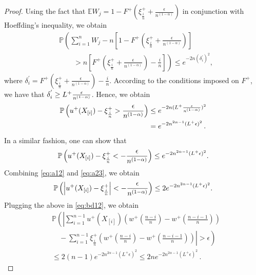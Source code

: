 \begin{proof}
Using the fact that 
$\mathbb{E} W_j = 1-F^{+}\left(\xi^+_{\frac{i}{n}} +\frac{\epsilon}{n^{(1-\alpha)}}\right)$ in conjunction with Hoeffding's inequality, we obtain
\begin{align*}
&\mathbb{P} \left( \sum _{i=1}^{n} W_j - n  \left[1-F^{+}\left(\xi^+_{\frac{i}{n}} +\frac{\epsilon}{n^{(1-\alpha) }  } \right) \right] \right.\\
&\left.\qquad> n
 \left[F^{+}\left(\xi^+_{\frac{i}{n}} +\frac{\epsilon}{n^{(1-\alpha)} } \right) - \frac{i}{n}\right]\right) \le e^{-2n
(\delta^{'}_i)^2},
\end{align*}
where $\delta^{'}_i= F^{+}\left(\xi^+_{\frac{i}{n}} +\frac{\epsilon} {n^{(1-\alpha)} }\right) - \frac{i}{n}$. According to the conditions imposed on $F^+$,  we have that $ \delta^{'}_i \geq L^{+} \frac{\epsilon}{n^{(1-\alpha)}}$.
Hence, we obtain
\begin{align}
\mathbb{P}\left(  u^+(X_{[i]}) - \xi^+_{\frac{i}{n}} > \frac {\epsilon}{n^{(1-\alpha)}} \right) &\le e^{-2n (L^{+}
\frac{\epsilon}{n^{(1-\alpha)}})^2 } \nonumber\\
&= e^{-2n^{2\alpha-1}  (L ^{+} \epsilon)^2}\,.
\label{eq:a12}
\end{align}
In a  similar fashion, one can show that 
\begin{align}
\mathbb{P}\left(  u^+(X_{[i]}) -\xi^+_{\frac{i}{n}} < -\frac {\epsilon} {n^{(1-\alpha)}} \right) \leq e^{-2n^{2\alpha-1}  (L^{+} \epsilon)^2}.
\label{eq:a23}
\end{align}
Combining \eqref{eq:a12} and \eqref{eq:a23},  we obtain 
\begin{align*}
\mathbb{P}\left(  \left| u^+(X_{[i]}) -\xi^+_{\frac{i}{n}} \right| < -\frac {\epsilon} {n^{(1-\alpha)}} \right) \leq 2
e^{-2n^{2\alpha -1}  (L^{+} \epsilon)^2}. 
\end{align*}
Plugging the above in \eqref{eq:bd12}, we obtain
\begin{align}
&
\mathbb{P} \left( \left| \sum_{i=1}^{n-1} u^+\left(X_{[i]}\right)  \left(w^+\left(\frac{n-i}{n} \right)  - w^+\left(\frac{n-i-1}{n} \right) \right) \right.\right. \nonumber\\
&\left.\left.\quad -
\sum_{i=1}^{n-1} \xi^+_{\frac{i}{n}} \left(w^+\left(\frac{n-i}{n} \right)  - w^+\left(\frac{n-i-1}{n} \right) \right) \right| >
\epsilon\right) \nonumber\\
&\leq 2(n-1) e^{-2n^{2\alpha-1}  (L^{+}\epsilon)^2} \leq 2ne^{-2n^{2\alpha-1}  (L^{+}\epsilon)^2}\,.\label{eq:holder-sample-complexity-extract}
\end{align}


\end{proof}
